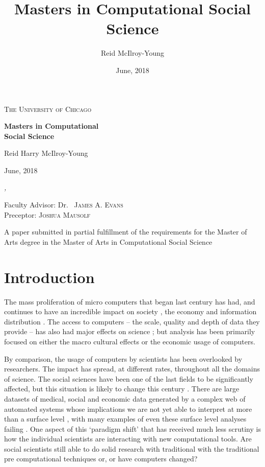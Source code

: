 \documentclass[12pt, a4paper]{article}
\author{Reid McIlroy-Young}
\title{Masters in Computational Social Science}
\date{June, 2018}
\begin{document}
\begin{titlepage}
	\centering
	{\scshape\LARGE The University of Chicago \par}
	\vspace{3cm}
	{\huge\bfseries Masters in Computational\\Social Science\par}
	\vspace{5cm}
	{ Reid Harry McIlroy-Young\par}
	{ June, 2018\par}
	
	\vfill
	{\itshape ,\par}
	\vspace{2cm}
	Faculty Advisor:
	Dr.~ \textsc{James A. Evans}\\
	Preceptor: \textsc{Joshua Mausolf}
	
	
	\vfill
	
	{A paper
		submitted in partial fulfillment of the requirements for the Master of Arts degree in
		the Master of Arts in Computational Social Science\par}
\end{titlepage}
\newpage
\tableofcontents
\newpage
\listoffigures
\listoftables
\newpage
\doublespacing
\setcounter{page}{1}


\section{Introduction}

The mass proliferation of micro computers that began last century has had, and continues to have an incredible impact on society \citep{weizenbaum1972impact}, the economy \citep{gordon2000does} and information distribution \citep{berners2010world}. The access to computers -- the scale, quality and depth of data they provide -- has also had major effects on science \citep{lazer2009life}; but analysis has been primarily focused on either the macro cultural effects \citep{pfaffenberger1988social} or the economic usage \citep{landauer1995trouble} of computers.

By comparison, the usage of computers by scientists has been overlooked by researchers. The impact has spread, at different rates, throughout all the domains of science. The social sciences have been one of the last fields to be significantly affected, but this situation is likely to change this century \citep{watts2007twenty}. There are large datasets of medical, social and economic data generated by a complex web of automated systems whose implications we are not yet able to interpret at more than a surface level \citep{kossinets2006empirical} \citep{back2010emotional}, with many examples of even these surface level analyses failing \citep{lazer2014parable} \citep{kramer2014experimental}. One aspect of this `paradigm shift' that has received much less scrutiny is how the individual scientists are interacting with new computational tools. Are social scientists still able to do solid research with traditional with the traditional pre computational techniques or, or have computers changed?
\end{document}
